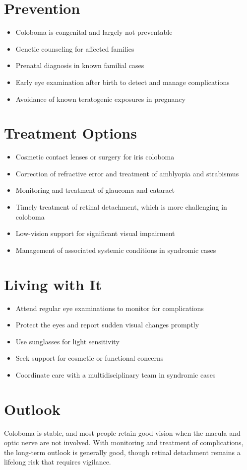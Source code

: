 \section{Prevention}
\begin{itemize}[noitemsep]
  \item Coloboma is congenital and largely not preventable
  \item Genetic counseling for affected families
  \item Prenatal diagnosis in known familial cases
  \item Early eye examination after birth to detect and manage complications
  \item Avoidance of known teratogenic exposures in pregnancy
\end{itemize}
\section{Treatment Options}
\begin{itemize}[noitemsep]
  \item Cosmetic contact lenses or surgery for iris coloboma
  \item Correction of refractive error and treatment of amblyopia and strabismus
  \item Monitoring and treatment of glaucoma and cataract
  \item Timely treatment of retinal detachment, which is more challenging in coloboma
  \item Low-vision support for significant visual impairment
  \item Management of associated systemic conditions in syndromic cases
\end{itemize}
\section{Living with It}
\begin{itemize}[noitemsep]
  \item Attend regular eye examinations to monitor for complications
  \item Protect the eyes and report sudden visual changes promptly
  \item Use sunglasses for light sensitivity
  \item Seek support for cosmetic or functional concerns
  \item Coordinate care with a multidisciplinary team in syndromic cases
\end{itemize}
\section{Outlook}
Coloboma is stable, and most people retain good vision when the macula and optic nerve are not involved. With monitoring and treatment of complications, the long-term outlook is generally good, though retinal detachment remains a lifelong risk that requires vigilance.
